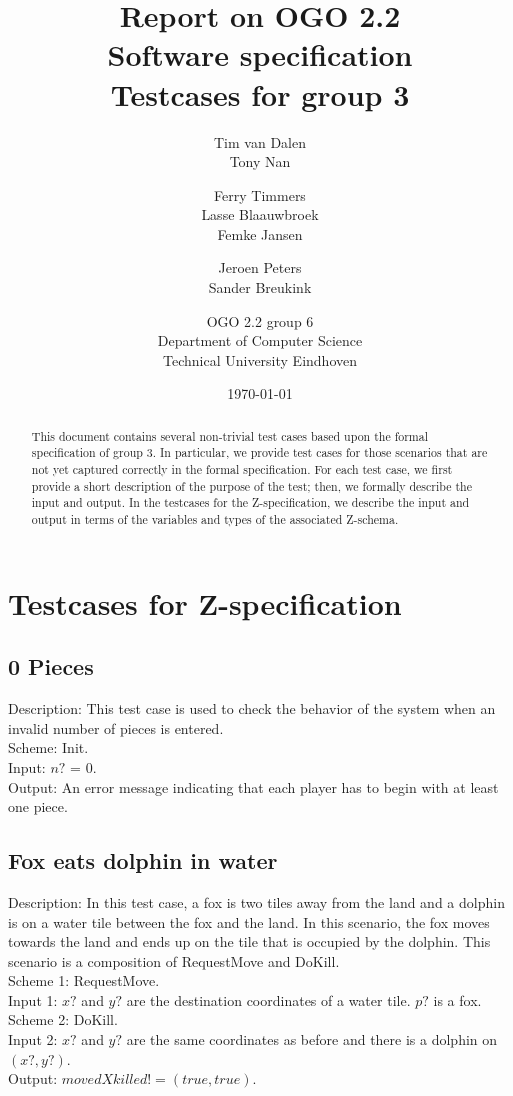 \documentclass[a4paper,11pt]{article}
\title{Report on OGO 2.2 \\ Software specification\\ Testcases for group 3}
\author{
        Tim van Dalen\\ Tony Nan \and Ferry Timmers\\ Lasse Blaauwbroek\\ Femke Jansen \and Jeroen Peters\\ Sander Breukink \and OGO 2.2 group 6 \\
                Department of Computer Science\\
        Technical University Eindhoven\\
}
\date{\today}
\begin{document}
\maketitle

\begin{abstract}
This document contains several non-trivial test cases based upon the formal specification of group 3. In particular, we provide test cases for those scenarios that are not yet captured correctly in the formal specification. For each test case, we first provide a short description of the purpose of the test; then, we formally describe the input and output. In the testcases for the Z-specification, we describe the input and output in terms of the variables and types of the associated Z-schema.
\end{abstract}

    \section{Testcases for Z-specification}

\subsection{0 Pieces}
    Description: This test case is used to check the behavior of the system when an invalid number of pieces is entered. \\
    Scheme: Init.\\
    Input: $n?$ = 0.\\
    Output: An error message indicating that each player has to begin with at least one piece.

\subsection{Fox eats dolphin in water}
    Description: In this test case, a fox is two tiles away from the land and a dolphin is on a water tile between the fox and the land. In this scenario, the fox moves towards the land and ends up on the tile that is occupied by the dolphin. This scenario is a composition of RequestMove and DoKill. \\
    Scheme 1: RequestMove.\\
    Input 1: $x?$ and $y?$ are the destination coordinates of a water tile. $p?$ is a fox.\\
    Scheme 2: DoKill.\\
    Input 2: $x?$ and $y?$ are the same coordinates as before and there is a dolphin on $(x?,y?)$.\\
    Output: $movedXkilled! = (true,true)$.\\
\end{document}
